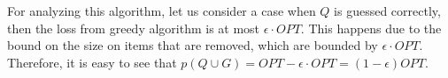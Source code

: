 For analyzing this algorithm, let us consider a case when $Q$ is guessed correctly, then the loss from greedy algorithm is at most $\epsilon \cdot OPT$.
This happens due to the bound on the size on items that are removed, which are bounded by $\epsilon \cdot OPT$.
Therefore, it is easy to see that $p(Q \cup G) = OPT - \epsilon \cdot OPT = (1-\epsilon)OPT$.
% 
% 
% 
% 
% 

